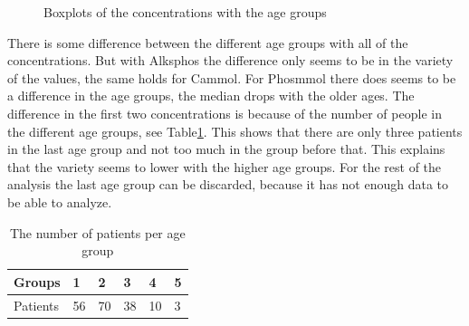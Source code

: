 \documentclass{article}
\begin{document}
\begin{figure}[H]
          \caption{Boxplots of the concentrations with the age groups}
          \label{fig:BoxAgegrp}
      \end{figure}

        There is some difference between the different age groups with all of the concentrations.
        But with Alksphos the difference only seems to be in the variety of the values, the same holds for Cammol.
        For Phosmmol there does seems to be a difference in the age groups, the median drops with the older ages.
        The difference in the first two concentrations is because of the number of people in the different age groups, see Table\ref{table:Agegrp}.
        This shows that there are only three patients in the last age group and not too much in the group before that.
        This explains that the variety seems to lower with the higher age groups.
        For the rest of the analysis the last age group can be discarded, because it has not enough data to be able to analyze.
        
        \begin{table}
          \begin{center}
            \begin{tabular}{l|lllll}
            \hline
            Groups&1&2&3&4&5\\
            \hline
            Patients&56&70&38&10&3\\
            \hline
            \end{tabular}
          \end{center}
          \caption{The number of patients per age group}
          \label{table:Agegrp}
        \end{table}
\end{document}
